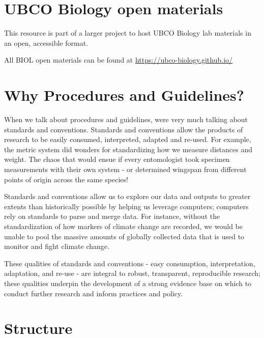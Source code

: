 \documentclass[
]{book}
\begin{document}
\hypertarget{ubco-biology-open-materials}{%
\section*{UBCO Biology open materials}\label{ubco-biology-open-materials}}

This resource is part of a larger project to host UBCO Biology lab materials in an open, accessible format.

All BIOL open materials can be found at \url{https://ubco-biology.github.io/}

\hypertarget{why-procedures-and-guidelines}{%
\section*{Why Procedures and Guidelines?}\label{why-procedures-and-guidelines}}

When we talk about procedures and guidelines, we\textquotesingle re very much talking about standards and conventions. Standards and conventions allow the products of research to be easily consumed, interpreted, adapted and re-used. For example, the metric system did wonders for standardizing how we measure distances and weight. The chaos that would ensue if every entomologist took specimen measurements with their own system - or determined wingspan from different points of origin across the same species!

Standards and conventions allow us to explore our data and outputs to greater extents than historically possible by helping us leverage computers; computers rely on standards to parse and merge data. For instance, without the standardization of how markers of climate change are recorded, we would be unable to pool the massive amounts of globally collected data that is used to monitor and fight climate change.

These qualities of standards and conventions - easy consumption, interpretation, adaptation, and re-use - are integral to robust, transparent, reproducible research; these qualities underpin the development of a strong evidence base on which to conduct further research and inform practices and policy.

\hypertarget{structure}{%
\section*{Structure}\label{structure}}
\end{document}
